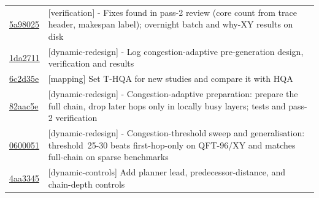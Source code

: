 \begin{longtable}{p{.15\linewidth}p{.77\linewidth}}
\href{https://github.com/sanjeevkrishnaa/Compiler-Driven-ACE/commit/5a980259a49db034736279437c9b8aeed279d31a}{5a98025} & [verification] - Fixes found in pass-2 review (core count from trace header, makespan label); overnight batch and why-XY results on disk \\
\href{https://github.com/sanjeevkrishnaa/Compiler-Driven-ACE/commit/1da2711d92c065428d2a387532e64a10aebb508f}{1da2711} & [dynamic-redesign] - Log congestion-adaptive pre-generation design, verification and results \\
\href{https://github.com/sanjeevkrishnaa/Compiler-Driven-ACE/commit/6c2d35e081f961ada441ee27a1839da82470d53a}{6c2d35e} & [mapping] Set T-HQA for new studies and compare it with HQA \\
\href{https://github.com/sanjeevkrishnaa/Compiler-Driven-ACE/commit/82aac5e1bdf39e380aee3894e73be7f959ea33df}{82aac5e} & [dynamic-redesign] - Congestion-adaptive preparation: prepare the full chain, drop later hops only in locally busy layers; tests and pass-2 verification \\
\href{https://github.com/sanjeevkrishnaa/Compiler-Driven-ACE/commit/0600051422853d87687ee570ac0f03b3c1a740f8}{0600051} & [dynamic-redesign] - Congestion-threshold sweep and generalisation: threshold~25-30 beats first-hop-only on QFT-96/XY and matches full-chain on sparse benchmarks \\
\href{https://github.com/sanjeevkrishnaa/Compiler-Driven-ACE/commit/4aa334542e9b9c8fe7a5f9cc8fe48ee2e4d2fa55}{4aa3345} & [dynamic-controls] Add planner lead, predecessor-distance, and chain-depth controls \\
\bottomrule\end{longtable}